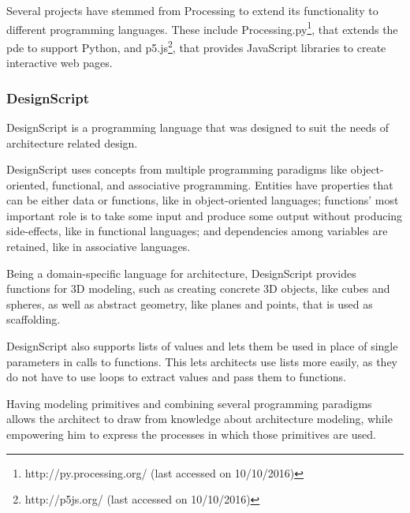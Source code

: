 Several projects have stemmed from Processing to extend its functionality to different programming languages.
These include Processing.py\footnote{http://py.processing.org/ (last accessed on 10/10/2016)}, that extends the \gls{pde} to support Python, and p5.js\footnote{http://p5js.org/ (last accessed on 10/10/2016)}, that provides JavaScript libraries to create interactive web pages.


\subsubsection{DesignScript}
\label{section:designscript:related}
DesignScript\cite{aish2012designscript} is a programming language that was designed to suit the needs of architecture related design.

DesignScript uses concepts from multiple programming paradigms like object-oriented, functional, and associative programming.
Entities have properties that can be either data or functions, like in object-oriented languages; functions' most important role is to take some input and produce some output without producing side-effects, like in functional languages; and dependencies among variables are retained, like in associative languages.


Being a domain-specific language for architecture, DesignScript provides functions for 3D modeling, such as creating concrete 3D objects, like cubes and spheres, as well as abstract geometry, like planes and points, that is used as scaffolding.

DesignScript also supports lists of values and lets them be used in place of single parameters in calls to functions.
This lets architects use lists more easily, as they do not have to use loops to extract values and pass them to functions.%

Having modeling primitives and combining several programming paradigms allows the architect to draw from knowledge about architecture modeling, while empowering him to express the processes in which those primitives are used.

